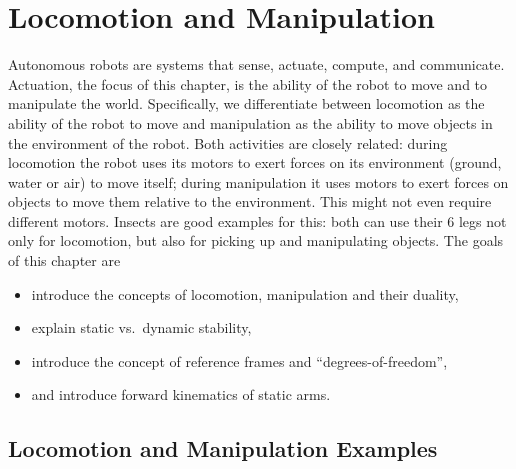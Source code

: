 \chapter{Locomotion and Manipulation}\label{chap:locomotion}
Autonomous robots are systems that sense, actuate, compute, and communicate. Actuation, the focus of this chapter, is the ability of the robot to move and to manipulate the world. Specifically, we differentiate between locomotion as the ability of the robot to move and manipulation as the ability to move objects in the environment of the robot. Both activities are closely related: during locomotion the robot uses its motors to exert forces on its environment (ground, water or air) to move itself; during manipulation it uses motors to exert forces on objects to move them relative to the environment. This might not even require different motors. Insects are good examples for this: both can use their 6 legs not only for locomotion, but also for picking up and manipulating objects. The goals of this chapter are
\begin{itemize}
\item introduce the concepts of locomotion, manipulation and their duality,
\item explain static vs.\ dynamic stability,
\item introduce the concept of reference frames and ``degrees-of-freedom'',
\item and introduce forward kinematics of static arms.
\end{itemize}

\section{Locomotion and Manipulation Examples}


